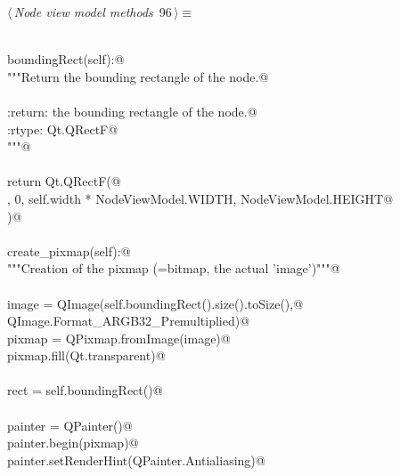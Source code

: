 \documentclass[
    a4paper,      %
    10pt,         %
    openright,    %
    notitlepage,  %
    parskip=half, %
]{scrreprt}       %
\theoremstyle{definition}                    %
\begin{document}
\begin{flushleft} \small
\begin{minipage}{\linewidth}\label{scrap158}\raggedright\small
{} $\langle\,${\itshape Node view model methods}\nobreak\ {\footnotesize {96}}$\,\rangle\equiv$
\vspace{-1exm}
\begin{list}{}{} \item
\mbox{}\lstinline@@\\
\mbox{}\lstinline@def boundingRect(self):@\\
\mbox{}\lstinline@    """Return the bounding rectangle of the node.@\\
\mbox{}\lstinline@@\\
\mbox{}\lstinline@    :return: the bounding rectangle of the node.@\\
\mbox{}\lstinline@    :rtype: Qt.QRectF@\\
\mbox{}\lstinline@    """@\\
\mbox{}\lstinline@@\\
\mbox{}\lstinline@    return Qt.QRectF(@\\
\mbox{}, 0, self.width * NodeViewModel.WIDTH, NodeViewModel.HEIGHT@\\
\mbox{}\lstinline@    )@\\
\mbox{}\lstinline@@\\
\mbox{}\lstinline@def create_pixmap(self):@\\
\mbox{}\lstinline@    """Creation of the pixmap (=bitmap, the actual 'image')"""@\\
\mbox{}\lstinline@@\\
\mbox{}\lstinline@    image = QImage(self.boundingRect().size().toSize(),@\\
\mbox{}\lstinline@                    QImage.Format_ARGB32_Premultiplied)@\\
\mbox{}\lstinline@    pixmap = QPixmap.fromImage(image)@\\
\mbox{}\lstinline@    pixmap.fill(Qt.transparent)@\\
\mbox{}\lstinline@@\\
\mbox{}\lstinline@    rect = self.boundingRect()@\\
\mbox{}\lstinline@@\\
\mbox{}\lstinline@    painter = QPainter()@\\
\mbox{}\lstinline@    painter.begin(pixmap)@\\
\mbox{}\lstinline@    painter.setRenderHint(QPainter.Antialiasing)@\\

\end{list}
\end{minipage}
\end{flushleft}
\end{document}
